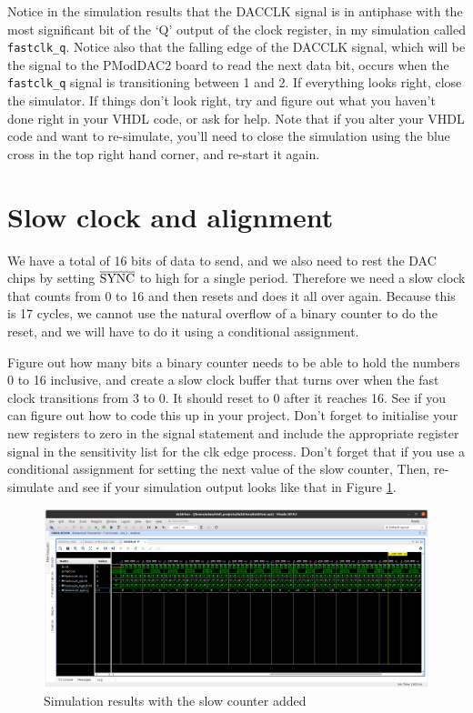 \documentclass[../physical_computing.tex]{subfiles}
\begin{document}
Notice in the simulation results that the DACCLK signal is in antiphase with the most significant bit of the `Q' output of the clock register, in my simulation called
\texttt{fastclk\_q}. Notice also that the falling edge of the DACCLK signal, which will
be the signal to the PModDAC2 board to read the next data bit, occurs when the 
\texttt{fastclk\_q} signal is transitioning between 1 and 2. If everything looks right, close the simulator. If things don't look right, try and figure out what you haven't done right in
your VHDL code, or ask for help. Note that if you alter your VHDL code and want to re-simulate, you'll need to close the simulation using the blue cross in the top right hand
corner, and re-start it again.

\section{Slow clock and alignment}
\label{sec:slowclk}

We have a total of 16 bits of data to send, and we also need to rest the DAC chips by
setting $\rm \overline{SYNC}$ to high for a single period. Therefore we need a slow
clock that counts from 0 to 16 and then resets and does it all over again. Because
this is 17 cycles, we cannot use the natural overflow of a binary counter to do the 
reset, and we will have to do it using a conditional assignment.

Figure out how many bits a binary counter needs to be able to hold the numbers 0 to
16 inclusive, and create a slow clock buffer that turns over when the fast clock
transitions from 3 to 0. It should reset to 0 after it reaches 16. See if you can 
figure out how to code this up in your project. Don't forget to initialise your new registers to zero in the signal statement and include the appropriate register signal in the sensitivity list for the clk edge process. Don't forget that if you use a conditional assignment for setting the next value of the slow counter, Then, re-simulate and see if your simulation output looks like that in Figure \ref{fig:vivdac5}.

\begin{figure}[htbp]
    \centering
    \includegraphics[width=1.0\textwidth]{figures/vivdac5.png}
    \caption{Simulation results with the slow counter added}
    \label{fig:vivdac5}
\end{figure}
\end{document}
